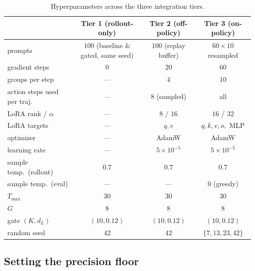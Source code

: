 \documentclass{article}
\begin{document}
\begin{table}[h]
\centering
\caption{Hyperparameters across the three integration tiers.}
\label{tab:hparams}
\small
\begin{tabular}{lccc}
\toprule
& Tier 1 (rollout-only) & Tier 2 (off-policy) & Tier 3 (on-policy) \\
\midrule
prompts                    & $100$ (baseline \& gated, same seed) & $100$ (replay buffer) & $60{\times}10$ resampled \\
gradient steps             & $0$            & $20$               & $60$ \\
groups per step            & ---            & $4$                & $10$ \\
action steps used per traj.\ & --- & $8$ (sampled) & all \\
LoRA rank / $\alpha$       & ---            & $8$ / $16$         & $16$ / $32$ \\
LoRA targets               & ---            & $q,v$              & $q,k,v,o,$ MLP \\
optimizer                  & ---            & AdamW              & AdamW \\
learning rate              & ---            & $5{\times}10^{-5}$ & $5{\times}10^{-5}$ \\
sample temp.\ (rollout)    & $0.7$          & $0.7$              & $0.7$ \\
sample temp.\ (eval)       & ---            & ---                & $0$ (greedy) \\
$T_{\max}$                 & $30$           & $30$               & $30$ \\
$G$                        & $8$            & $8$                & $8$ \\
gate $(K, d_L)$            & $(10, 0.12)$ & $(10, 0.12)$ & $(10, 0.12)$ \\
random seed                & $42$           & $42$               & $\{7, 13, 23, 42\}$ \\
\bottomrule
\end{tabular}
\end{table}

\subsection{Setting the precision floor}
\label{app:precfloor}
\end{document}
